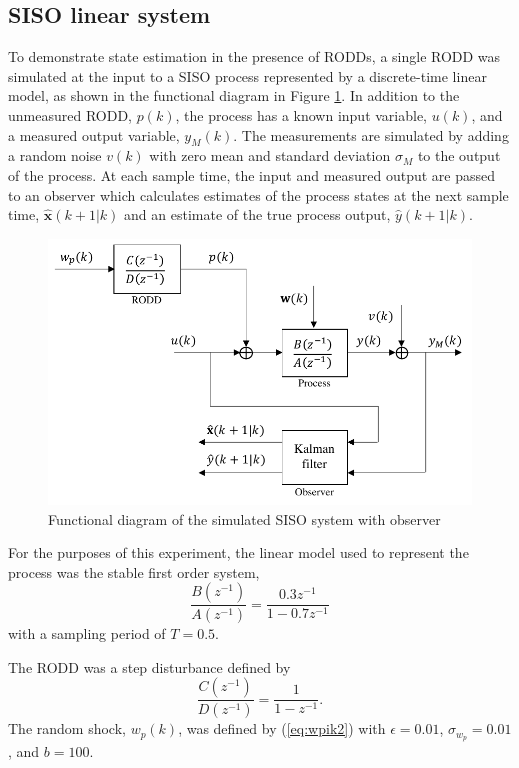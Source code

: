 \subsection{SISO linear system} \label{sim-obs-lin-1}

To demonstrate state estimation in the presence of RODDs, a single RODD was simulated at the input to a SISO process represented by a discrete-time linear model, as shown in the functional diagram in Figure \ref{fig:sim-sys-diag-siso}. In addition to the unmeasured RODD, $p(k)$, the process has a known input variable, $u(k)$, and a measured output variable, $y_M(k)$. The measurements are simulated by adding a random noise $v(k)$ with zero mean and standard deviation $\sigma_M$ to the output of the process. At each sample time, the input and measured output are passed to an observer which calculates estimates of the process states at the next sample time, $\hat{\mathbf{x}}(k+1|k)$ and an estimate of the true process output, $\hat{y}(k+1|k)$.

\begin{figure}[htp]
	\centering
	\includegraphics[width=11.5cm]{images/sim-sys-diag-siso.pdf}
	\caption{Functional diagram of the simulated SISO system with observer}
	\label{fig:sim-sys-diag-siso}
\end{figure}

For the purposes of this experiment, the linear model used to represent the process was the stable first order system,
\begin{equation}
	\frac{B(z^{-1})}{A(z^{-1})} = \frac{0.3z^{-1}}{1-0.7z^{-1}}
\end{equation}
with a sampling period of $T=0.5$.

The RODD was a step disturbance defined by
\begin{equation}
	\frac{C(z^{-1})}{D(z^{-1})} = \frac{1}{1-z^{-1}}.
\end{equation}
The random shock, $w_p(k)$, was defined by (\ref{eq:wpik2}) with $\epsilon=0.01$, $\sigma_{w_p}=0.01$, and $b=100$.

